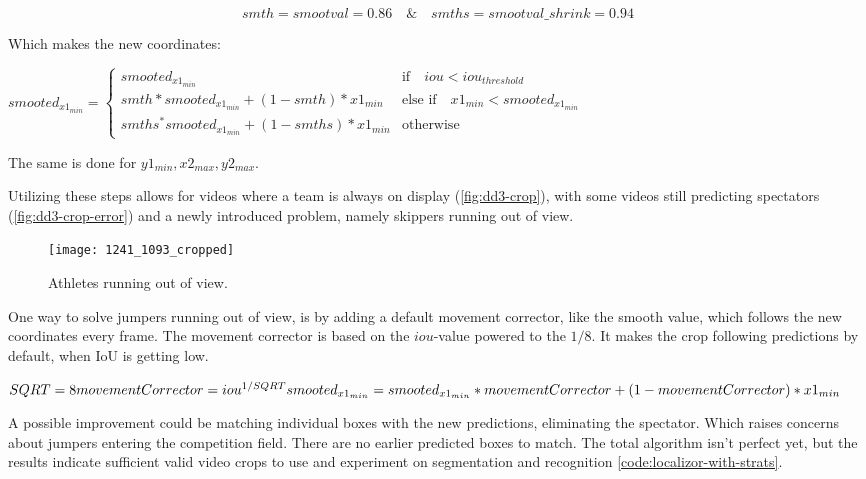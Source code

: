 $$ smth = smootval = 0.86  \quad \& \quad smths = smootval\_shrink = 0.94 $$

Which makes the new coordinates:

\bigskip
\begin{math}
   smooted_{x1_{min}} =
   \begin{cases}
       smooted_{x1_{min}} & \text{if} \quad iou < iou_{threshold} \\
       smth * smooted_{x1_{min}} + (1-smth) * x1_{min} & \text{else if} \quad x1_{min} < smooted_{x1_{min}} \\
       smths^ * smooted_{x1_{min}} + (1-smths) * x1_{min} & \text{otherwise}
   \end{cases}
\end{math}
\medskip

The same is done for \( y1_{min}, x2_{max}, y2_{max} \).

Utilizing these steps allows for videos where a team is always on display (\ref{fig:dd3-crop}), with some videos still predicting spectators (\ref{fig:dd3-crop-error}) and a newly introduced problem, namely skippers running out of view.


\begin{figure}
    \centering
    \texttt{[image: 1241\_1093\_cropped]}
    \caption[dd3-crop-error]{Athletes running out of view.}
    \label{fig:dd3-crop-error-out-of-view}
\end{figure}

One way to solve jumpers running out of view, is by adding a default movement corrector, like the smooth value, which follows the new coordinates every frame. The movement corrector is based on the \(iou\)-value powered to the \(1/8\). It makes the crop following predictions by default, when IoU is getting low.

\medskip

\begin{math}
    SQRT = 8 \\
    movementCorrector = iou^{1/SQRT} \\
    smooted_{x1_{min}} = smooted_{x1_{min}} * movementCorrector + (1 - movementCorrector) * {x1_{min}}
\end{math}

\medskip

A possible improvement could be matching individual boxes with the new predictions, eliminating the spectator. Which raises concerns about jumpers entering the competition field. There are no earlier predicted boxes to match.
The total algorithm isn't perfect yet, but the results indicate sufficient valid video crops to use and experiment on segmentation and recognition \ref{code:localizor-with-strats}.

